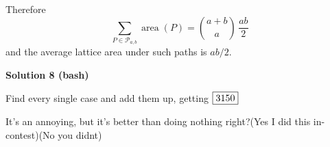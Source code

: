 \begin{enumerate}
 Therefore
 \[\boxed{\; \sum_{P\in\mathcal P_{a,b}}\operatorname{area}(P)       =\binom{a+b}{a}\,\frac{ab}{2}}\]and the average lattice area under such paths is $ab/2$.

 



\textbf{Solution 8 (bash)}

Find every single case and add them up, getting $\fbox{3150}$

 It's an annoying, but it's better than doing nothing right?(Yes I did this in-contest)(No you didnt)

 


\end{enumerate}